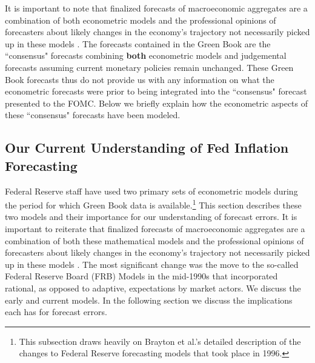\documentclass[a4paper]{article}\usepackage{graphicx, color}
\begin{document}
It is important to note that finalized forecasts of macroeconomic aggregates are a combination of both econometric models and the professional opinions of forecasters about likely changes in the economy's trajectory not necessarily picked up in these models \citep{Karamouzis1989,Reifschneider1997}. The forecasts contained in the Green Book are the ``consensus" forecasts combining {\bf{both}} econometric models and judgemental forecasts assuming current monetary policies remain unchanged. These Green Book forecasts thus do not provide us with any information on what the econometric forecasts were prior to being integrated into the ``consensus" forecast presented to the FOMC. Below we briefly explain how the econometric aspects of these ``consensus" forecasts have been modeled.

\subsection{Our Current Understanding of Fed Inflation Forecasting}

Federal Reserve staff have used two primary sets of econometric models during the period for which Green Book data is available.\footnote{This subsection draws heavily on Brayton et al.'s \cite{Brayton1997} detailed description of the changes to Federal Reserve forecasting models that took place in 1996.} This section describes these two models and their importance for our understanding of forecast errors. It is important to reiterate that finalized forecasts of macroeconomic aggregates are a combination of both these mathematical models and the professional opinions of forecasters about likely changes in the economy's trajectory not necessarily picked up in these models \citep{Karamouzis1989,Reifschneider1997,Taylor1997}. The most significant change was the move to the so-called Federal Reserve Board (FRB) Models in the mid-1990s that incorporated rational, as opposed to adaptive, expectations by market actors. We discuss the early and current models. In the following section we discuss the implications each has for forecast errors.
\end{document}
